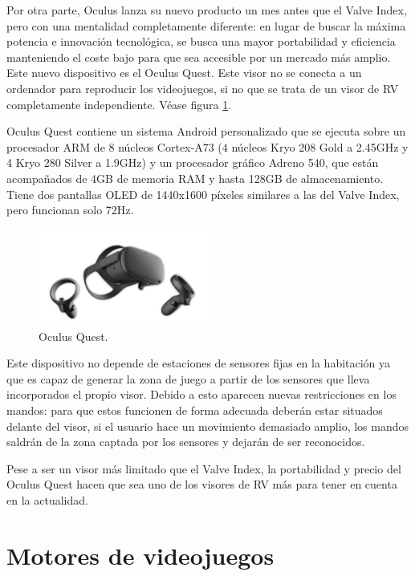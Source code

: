 Por otra parte, Oculus lanza su nuevo producto un mes antes que el Valve Index, pero con una mentalidad completamente diferente: en lugar de buscar la máxima potencia e innovación tecnológica, se busca una mayor portabilidad y eficiencia manteniendo el coste bajo para que sea accesible por un mercado más amplio. Este nuevo dispositivo es el Oculus Quest. Este visor no se conecta a un ordenador para reproducir los videojuegos, si no que se trata de un visor de RV completamente independiente. Véase figura \ref{fig:EA_oculusQuest}.

Oculus Quest contiene un sistema Android personalizado que se ejecuta sobre un procesador ARM de 8 núcleos Cortex-A73 (4 núcleos Kryo 208 Gold a 2.45GHz y 4 Kryo 280 Silver a 1.9GHz) y un procesador gráfico Adreno 540, que están acompañados de 4GB de memoria RAM y hasta 128GB de almacenamiento. Tiene dos pantallas OLED de 1440x1600 píxeles similares a las del Valve Index, pero funcionan solo 72Hz.


\begin{figure}
  \centering
\includegraphics[width=0.5\textwidth]{03.EstudioProblema/01.EstadoArte/00.Figuras/25.meta_quest_2.jpg}
    \caption{Oculus Quest. \cite{EA_img_oculusQuest}}
    \label{fig:EA_oculusQuest}
\end{figure}


Este dispositivo no depende de estaciones de sensores fijas en la habitación ya que es capaz de generar la zona de juego a partir de los sensores que lleva incorporados el propio visor. Debido a esto aparecen nuevas restricciones en los mandos: para que estos funcionen de forma adecuada deberán estar situados delante del visor, si el usuario hace un movimiento demasiado amplio, los mandos saldrán de la zona captada por los sensores y dejarán de ser reconocidos.

Pese a ser un visor más limitado que el Valve Index, la portabilidad y precio del Oculus Quest hacen que sea uno de los visores de RV más para tener en cuenta en la actualidad.





\section{Motores de videojuegos}

